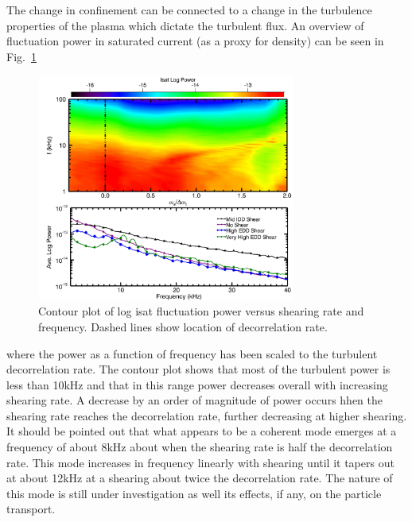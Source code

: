 \documentclass[%
 aps,
 prl,
 amsmath,amssymb,
 reprint,%
]{revtex4-1}
\begin{document}
The change in confinement can be connected to a change in the turbulence properties of the plasma which dictate the turbulent flux. An overview of fluctuation power in saturated current (as a proxy for density) can be seen in 
Fig.~\ref{fig:powercontour}
\begin{figure}
\begin{center}
\includegraphics[width=8.5cm]{powercontour.pdf}%
\end{center}
\caption{\label{fig:powercontour} Contour plot of log isat fluctuation power versus shearing rate and frequency. Dashed lines show location of decorrelation rate.}
\end{figure}
where the power as a function of frequency has been scaled to the turbulent decorrelation rate. The contour plot shows that most of the turbulent power is less than 10kHz and that in this range power decreases overall with increasing shearing rate. A decrease by an order of magnitude of power occurs hhen the shearing rate reaches the decorrelation rate, further decreasing at higher shearing. It should be pointed out that what appears to be a coherent mode emerges at a frequency of about 8kHz about when the shearing rate is half the decorrelation rate. This mode increases in frequency linearly with shearing until it tapers out at about 12kHz at a shearing about twice the decorrelation rate. The nature of this mode is still under investigation as well its effects, if any, on the particle transport. 
\end{document}
